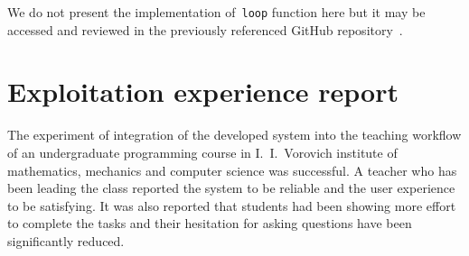 We do not present the implementation of~\lstinline{loop} function here but it
may be accessed and reviewed in the previously referenced GitHub
repository~\cite{sbbRepo}.

\section{Exploitation experience report}

The experiment of integration of the developed system into the teaching workflow
of an undergraduate programming course in I.~I.~Vorovich institute of mathematics,
mechanics and computer science was successful. A teacher who has been leading the
class reported the system to be reliable and the user experience to be satisfying.
It was also reported that students had been showing more effort to complete the
tasks and their hesitation for asking questions have been significantly reduced.
